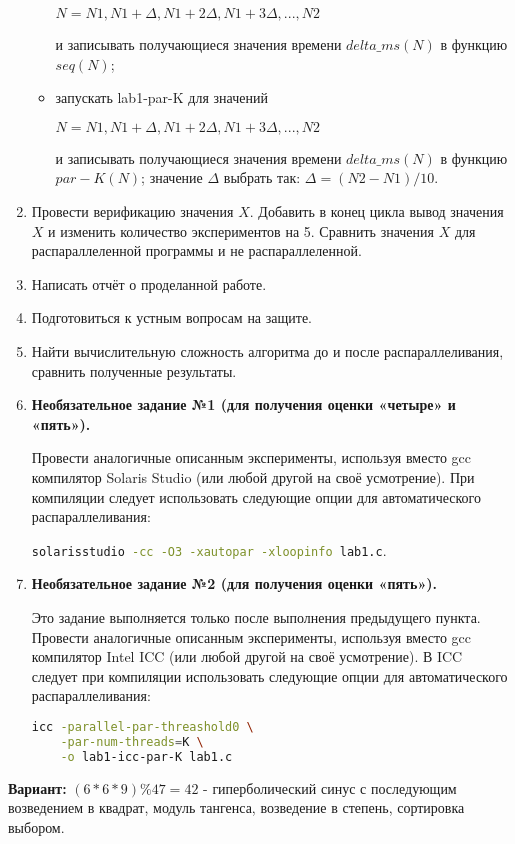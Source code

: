 \documentclass[14pt, a4paper, oneside, final]{extarticle}
\begin{document}
\begin{enumerate}
\begin{itemize}
        $N = N1, N1 + \Delta, N1 + 2\Delta, N1 + 3\Delta, ..., N2$

        и записывать получающиеся значения времени $delta\_ms(N)$ в функцию $seq(N)$;
        \item запускать lab1-par-K для значений

        $N = N1, N1 + \Delta, N1 + 2\Delta, N1 + 3\Delta, ..., N2$

        и записывать получающиеся значения времени $delta\_ms(N)$ в функцию $par-K(N)$;
        значение $\Delta$ выбрать так: $\Delta = (N2 - N1) / 10$.
    \end{itemize}
 \item Провести верификацию значения $X$. Добавить в конец цикла вывод значения $X$ и изменить количество экспериментов на 5. Сравнить значения $X$ для распараллеленной программы и не распараллеленной.
 \item Написать отчёт о проделанной работе.
 \item Подготовиться к устным вопросам на защите.
 \item Найти вычислительную сложность алгоритма до и после распараллеливания, сравнить полученные результаты.
 \item \textbf{Необязательное задание №1 (для получения оценки «четыре» и «пять»).}

 Провести аналогичные описанным эксперименты, используя вместо gcc компилятор Solaris Studio (или любой другой на своё усмотрение). При компиляции следует использовать следующие опции для автоматического распараллеливания:

 \lstinline[language=Bash]{solarisstudio -cc -O3 -xautopar -xloopinfo lab1.c}.
 \item \textbf{Необязательное задание №2 (для получения оценки «пять»).}

 Это задание выполняется только после выполнения предыдущего пункта. Провести аналогичные описанным эксперименты, используя вместо gcc компилятор Intel ICC (или любой другой на своё усмотрение). В ICC следует при компиляции использовать следующие опции для автоматического распараллеливания:

 \begin{lstlisting}[language=Bash]
 icc -parallel-par-threashold0 \
    -par-num-threads=K \
    -o lab1-icc-par-K lab1.c
 \end{lstlisting}
\end{enumerate}

\textbf{Вариант:} $(6*6*9) \% 47 = 42$ - гиперболический синус с последующим возведением в квадрат, модуль тангенса, возведение в степень, сортировка выбором.
\end{document}
